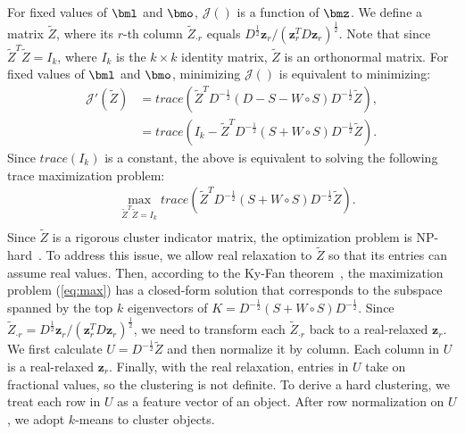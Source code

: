 For fixed values of $\bml$ and $\bmo$, $\mathcal{J}()$ is a function of $\bmz$.
We define a matrix $\tilde{Z}$, where its $r$-th column
$\tilde{Z}_{\cdot r}$ 
equals $D^{\frac{1}{2}}\bm{z}_r/(\bm{z}_r^TD\bm{z}_r)^{\frac{1}{2}}$. 
Note that since $\tilde{Z}^T\tilde{Z} = I_k$, where $I_k$ is the $k \times k$ identity matrix,
$\tilde{Z}$ is an orthonormal matrix.
For fixed values of $\bml$ and $\bmo$, minimizing $\mathcal{J}()$ is equivalent to minimizing:
\begin{equation}
\label{eq:obj:trans2}
\begin{split}
\mathcal{J}'(\tilde{Z}) & = \mathit{trace}(\tilde{Z}^TD^{-\frac{1}{2}}(D-S-W\circ S)D^{-\frac{1}{2}}\tilde{Z}), \\
& = \mathit{trace}(I_k-\tilde{Z}^TD^{-\frac{1}{2}}(S+W\circ S)D^{-\frac{1}{2}}\tilde{Z}).
\end{split}
\end{equation}
Since $trace(I_k)$ is a constant, the above is equivalent to solving the following trace maximization problem:
\begin{equation}
\begin{split}
\label{eq:max}
& \max_{\tilde{Z}^T\tilde{Z} = I_k}\mathit{trace}(\tilde{Z}^TD^{-\frac{1}{2}}(S+W\circ S)D^{-\frac{1}{2}}\tilde{Z}).  \\
\end{split}
\end{equation}
Since $\tilde{Z}$ is a rigorous cluster indicator matrix, the optimization problem is NP-hard~\cite{DBLP:dblp_conf/icml/LongZWY06}.
To address this issue, we allow real relaxation to $\tilde{Z}$ so that its entries can assume real values. Then,
according to the Ky-Fan theorem~\cite{bhatia1997matrix}, 
the maximization problem (\ref{eq:max}) has a closed-form solution that corresponds to the subspace spanned 
by the top $k$ eigenvectors of $K = D^{-\frac{1}{2}}(S+W\circ S)D^{-\frac{1}{2}}$. 
Since $\tilde{Z}_{\cdot r} = D^{\frac{1}{2}}\bm{z}_r/(\bm{z}_r^TD\bm{z}_r)^{\frac{1}{2}}$,
we need to transform each $\tilde{Z}_{\cdot r}$ back to a real-relaxed $\bm z_r$. 
We first calculate
$U = D^{-\frac{1}{2}}\tilde{Z}$ and then
normalize it by column.
Each column in $U$ is a real-relaxed $\bm z_r$.
Finally, with the real relaxation, entries in $U$ take on fractional values, so the clustering is not
definite. To derive a hard clustering, 
we treat each row in $U$ as a feature vector of an object.
After row normalization on $U$, we adopt $k$-means to cluster objects.

